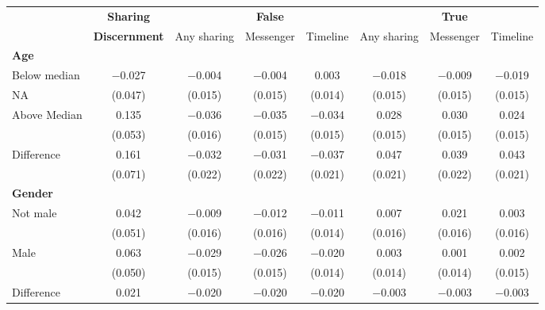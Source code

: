 
\begin{tabular}[t]{lccccccc}
 & \textbf{Sharing} &  & \textbf{False} &  &  & \textbf{True} & \\
 & \textbf{Discernment} & Any sharing & Messenger & Timeline & Any sharing & Messenger & Timeline\\\cmidrule(lr){2-2} \cmidrule(lr){3-5} \cmidrule(lr){6-8} \multicolumn{4}{l}{\textbf{Age}} \rule{0pt}{1.2\normalbaselineskip}\\
\hspace{1em} Below median & \num{-0.027} & \num{-0.004} & \num{-0.004} & \num{0.003} & \num{-0.018} & \num{-0.009} & \num{-0.019}\\
\hspace{2em}NA & (\num{0.047}) & (\num{0.015}) & (\num{0.015}) & (\num{0.014}) & (\num{0.015}) & (\num{0.015}) & (\num{0.015})\\
\hspace{1em} Above Median & \num{0.135} & \num{-0.036} & \num{-0.035} & \num{-0.034} & \num{0.028} & \num{0.030} & \num{0.024}\\
\hspace{2em} & (\num{0.053}) & (\num{0.016}) & (\num{0.015}) & (\num{0.015}) & (\num{0.015}) & (\num{0.015}) & (\num{0.015})\\\cmidrule(lr){2-8}
\hspace{1em} Difference & \num{0.161} & \num{-0.032} & \num{-0.031} & \num{-0.037} & \num{0.047} & \num{0.039} & \num{0.043}\\
 & (\num{0.071}) & (\num{0.022}) & (\num{0.022}) & (\num{0.021}) & (\num{0.021}) & (\num{0.022}) & (\num{0.021})\\\multicolumn{4}{l}{\textbf{Gender}} \rule{0pt}{1.2\normalbaselineskip}\\
\hspace{1em} Not male & \num{0.042} & \num{-0.009} & \num{-0.012} & \num{-0.011} & \num{0.007} & \num{0.021} & \num{0.003}\\
 & (\num{0.051}) & (\num{0.016}) & (\num{0.016}) & (\num{0.014}) & (\num{0.016}) & (\num{0.016}) & (\num{0.016})\\
\hspace{1em} Male & \num{0.063} & \num{-0.029} & \num{-0.026} & \num{-0.020} & \num{0.003} & \num{0.001} & \num{0.002}\\
 & (\num{0.050}) & (\num{0.015}) & (\num{0.015}) & (\num{0.014}) & (\num{0.014}) & (\num{0.014}) & (\num{0.015})\\\cmidrule(lr){2-8}
\hspace{1em} Difference & \num{0.021} & \num{-0.020} & \num{-0.020} & \num{-0.020} & \num{-0.003} & \num{-0.003} & \num{-0.003}\\

\end{tabular}
